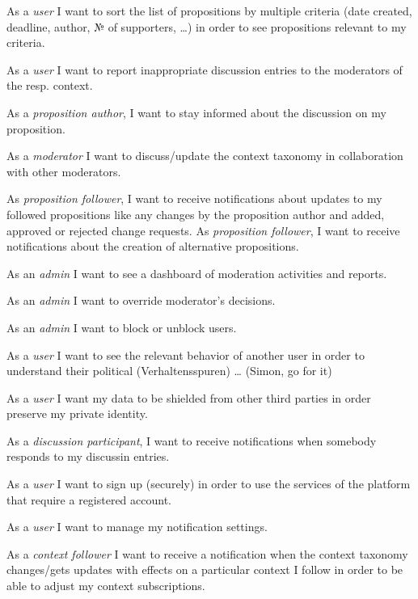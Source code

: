  As a \textit{user} I want to sort the list of propositions by multiple criteria (date created, deadline, author, № of supporters, …) in order to see propositions relevant to my criteria.

 As a \textit{user} I want to report inappropriate discussion entries to the moderators of the resp. context.

 As a \textit{proposition author}, I want to stay informed about the discussion on my proposition.

 As a \textit{moderator} I want to discuss/update the context taxonomy in collaboration with other moderators.

 As \textit{proposition follower}, I want to receive notifications about updates to my followed propositions like any changes by the proposition author and added, approved or rejected change requests.
 As \textit{proposition follower}, I want to receive notifications about the creation of alternative propositions.

 As an \textit{admin} I want to see a dashboard of moderation activities and reports.

 As an \textit{admin} I want to override moderator’s decisions.

 As an \textit{admin} I want to block or unblock users.

 As a \textit{user} I want to see the relevant behavior of another user in order to understand their political (Verhaltensspuren) … (Simon, go for it) 

 As a \textit{user} I want my data to be shielded from other third parties in order preserve my private identity.

 As a \textit{discussion participant}, I want to receive notifications when somebody responds to my discussin entries.

 As a \textit{user} I want to sign up (securely) in order to use the services of the platform that require a registered account.

 As a \textit{user} I want to manage my notification settings.

 As a \textit{context follower} I want to receive a notification when the context taxonomy changes/gets updates with effects on a particular context I follow in order to be able to adjust my context subscriptions.

